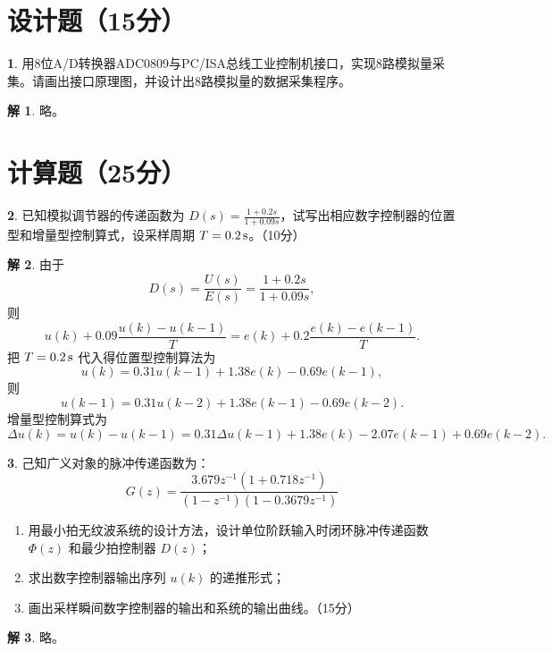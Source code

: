 \documentclass[punct=kaiming,fontset=none]{ctexart}
\theoremstyle{definition}
\newtheorem{ti}{}[section]
\newtheorem*{solution}{解}
\let\SIold\SI
\renewcommand{\SI}[2]{\mbox{\SIold{#1}{#2}}}
\begin{document}
\section{设计题（15分）}
\begin{ti}
用8位A/D转换器ADC0809与PC/ISA总线工业控制机接口，实现8路模拟量采集。请画出接口原理图，并设计出8路模拟量的数据采集程序。
\begin{solution}
  略。
\end{solution}
\end{ti}

\section{计算题（25分）}
\begin{ti}
已知模拟调节器的传递函数为 $D(s) = \frac{1+0.2s}{1+0.09s}$，试写出相应数字控制器的位置型和增量型控制算式，设采样周期 $T = \SI{0.2}{s}$。（10分）
\begin{solution}
  由于 \[D(s) = \frac{U(s)}{E(s)} = \frac{1+0.2s}{1+0.09s},\]
  则 \[ u(k) + 0.09 \frac{u(k) - u(k-1)}{T} = e(k) + 0.2 \frac{e(k) - e(k-1)}{T}. \]
  把 $T = \SI{0.2}{s}$ 代入得位置型控制算法为 \[ u(k) = 0.31 u(k-1) + 1.38 e(k) - 0.69 e(k-1), \]
  则 \[ u(k-1) = 0.31 u(k-2) + 1.38 e(k-1) - 0.69 e(k-2). \]
  增量型控制算式为 \[ \Delta u(k) = u(k) - u(k-1) = 0.31 \Delta u(k-1) + 1.38 e(k) - 2.07 e(k-1) + 0.69 e(k-2). \]
\end{solution}
\end{ti}
\begin{ti}
己知广义对象的脉冲传递函数为：\[ G(z) = \frac{3.679z^{-1}(1+0.718z^{-1})}{(1-z^{-1})(1-0.3679z^{-1})} \]
\begin{enumerate}
  \item 用最小拍无纹波系统的设计方法，设计单位阶跃输入时闭环脉冲传递函数 $\varPhi(z)$ 和最少拍控制器 $D(z)$；
  \item 求出数字控制器输出序列 $u(k)$ 的递推形式；
  \item 画出采样瞬间数字控制器的输出和系统的输出曲线。（15分）
\end{enumerate}
\begin{solution}
  略。
\end{solution}
\end{ti}
\end{document}
